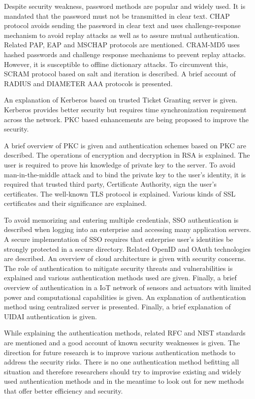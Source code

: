 \begin{multicols}{2}
Despite security weakness, password methods are popular and widely used. It is mandated that the password must not be transmitted in clear text. CHAP protocol avoids sending the password in clear text and uses challenge-response mechanism to avoid replay attacks as well as to assure mutual authentication. Related PAP, EAP and MSCHAP protocols are mentioned. CRAM-MD5 uses hashed passwords and challenge response mechanisms to prevent replay attacks. However, it is susceptible to offline dictionary attacks. To circumvent this, SCRAM protocol based on salt and iteration is described. A brief account of RADIUS and DIAMETER AAA protocols is presented.

An explanation of Kerberos based on trusted Ticket Granting server is given. Kerberos provides better security but requires time synchronization requirement across the network. PKC based enhancements are being proposed to improve the security.

A brief overview of PKC is given and authentication schemes based on PKC are described. The operations of encryption and decryption in RSA is explained. The user is required to prove his knowledge of private key to the server. To avoid man-in-the-middle attack and to bind the private key to the user's identity, it is required that trusted third party, Certificate Authority, sign the user's certificates. The well-known TLS protocol is explained. Various kinds of SSL certificates and their significance are explained.

To avoid memorizing and entering multiple credentials, SSO authentication is described when logging into an enterprise and accessing many application servers. A secure implementation of SSO requires that enterprise user's identities be strongly protected in a secure directory. Related OpenID and OAuth technologies are described. An overview of cloud architecture is given with security concerns. The role of authentication to mitigate security threats and vulnerabilities is explained and various authentication methods used are given. Finally, a brief overview of authentication in a IoT network of sensors and actuators with limited power and computational capabilities is given. An explanation of authentication method using centralized server is presented. Finally, a brief explanation of UIDAI authentication is given.

While explaining the authentication methods, related RFC and NIST standards are mentioned and a good account of known security weaknesses is given. The direction for future research is to improve various authentication methods to address the security risks. There is no one authentication method befitting all situation and therefore researchers should try to improvise existing and widely used authentication methods and in the meantime to look out for new methods that offer better efficiency and security.


\end{multicols}

